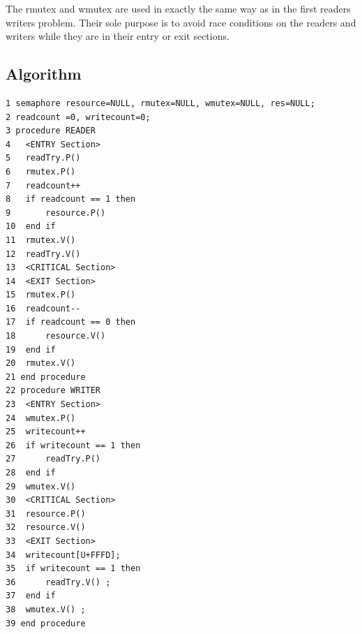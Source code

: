 The rmutex and wmutex are used in exactly the same way as in the first readers writers problem. Their sole purpose is to avoid race conditions on the readers and writers while they are in their entry or exit sections.

\subsection{Algorithm}
\begin{verbatim}
1 semaphore resource=NULL, rmutex=NULL, wmutex=NULL, res=NULL;
2 readcount =0, writecount=0;
3 procedure READER
4   <ENTRY Section>
5   readTry.P()
6   rmutex.P()
7   readcount++
8   if readcount == 1 then
9       resource.P()
10  end if
11  rmutex.V()
12  readTry.V()
13  <CRITICAL Section>
14  <EXIT Section>
15  rmutex.P()
16  readcount--
17  if readcount == 0 then
18      resource.V()
19  end if
20  rmutex.V()
21 end procedure
22 procedure WRITER
23  <ENTRY Section>
24  wmutex.P()
25  writecount++
26  if writecount == 1 then
27      readTry.P()
28  end if
29  wmutex.V()
30  <CRITICAL Section>
31  resource.P()
32  resource.V()
33  <EXIT Section>
34  writecount[U+FFFD];
35  if writecount == 1 then
36      readTry.V() ;
37  end if
38  wmutex.V() ;
39 end procedure
\end{verbatim}

